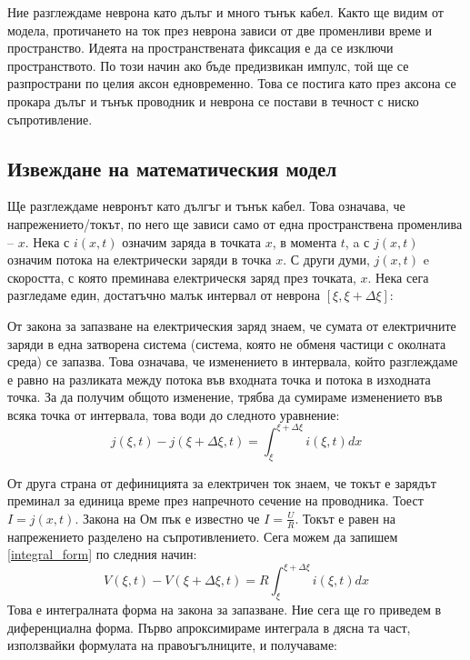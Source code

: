 \documentclass{article}
\begin{document}
        Ние разглеждаме неврона като дълъг и много тънък кабел. Както ще видим от модела, протичането на ток през неврона
        зависи от две променливи време и пространство. Идеята на пространствената фиксация е да се изключи пространството.
        По този начин ако бъде предизвикан импулс, той ще се разпространи по целия аксон едновременно. Това се постига като
        през аксона се прокара дълъг и тънък проводник и неврона се постави в течност с ниско съпротивление.
    \subsection{Извеждане на математическия модел}
    Ще разглеждаме невронът като дългъг и тънък кабел. Това означава, че напрежението/токът, по него ще зависи само от една пространствена
    променлива -- $x$. Нека с $i\left(x, t\right)$ означим заряда в точката $x$, в момента $t$, a с $j\left(x, t\right)$ означим потока на електрически заряди в точка $x$. С други думи, $j\left(x, t\right)$ e
    скоростта, с която преминава електрическя заряд през точката, $x$. Нека сега разгледаме един, достатъчно малък интервал от неврона
    $\left[\xi, \xi+\Delta\xi\right]$:

    \begin{figure}[h!]
        \centering
        
        \caption{}
    \end{figure}

    От закона за запазване на електрическия заряд знаем, че сумата от електричните заряди в една затворена система (система, която не обменя
    частици с околната среда) се запазва. Това означава, че изменението в интервала, който разглеждаме е равно на разликата между потока във
    входната точка и потока в изходната точка. За да получим общото изменение, трябва да сумираме изменението във всяка точка от интервала,
    това води до следното уравнение:
    \begin{equation}\label{integral_form}
        j\left(\xi,t\right) - j\left(\xi + \Delta\xi, t\right) = \int_{\xi}^{\xi + \Delta\xi} i\left(\xi,t\right)dx
    \end{equation}

    От друга страна от дефиницията за електричен ток знаем, че токът е зарядът преминал за единица време през напречното сечение на
    проводника. Тоест $I = j\left(x, t\right)$. Закона на Ом пък е известно че $I = \frac{U}{R} $. Токът е равен на напрежението разделено
    на съпротивлението. Сега можем да запишем \eqref{integral_form} по следния начин:
    \begin{equation}
        V\left(\xi,t\right) - V\left(\xi + \Delta\xi, t\right) = R\int_{\xi}^{\xi + \Delta\xi} i\left(\xi,t\right)dx
    \end{equation}
    Това е интегралната форма на закона за запазване. Ние сега ще го приведем в диференциална форма. Първо апроксимираме интеграла в дясна
    та част, използвайки формулата на правоъгълниците, и получаваме:
    
\end{document}
